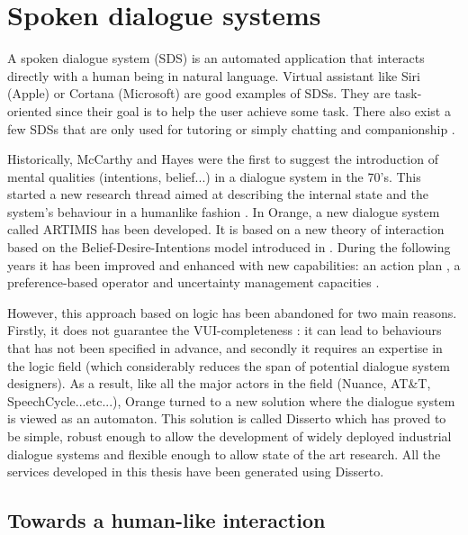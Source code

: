 \section{Spoken dialogue systems}
        
	A spoken dialogue system (SDS) is an automated application that interacts directly with a human being in natural language. Virtual assistant like Siri (Apple) or Cortana (Microsoft) are good examples of SDSs. They are task-oriented since their goal is to help the user achieve some task. There also exist a few SDSs that are only used for tutoring \cite{Daubigney2013} or simply chatting and companionship \cite{Sidner2013}.
	
	Historically, McCarthy and Hayes were the first to suggest the introduction of mental qualities (intentions, belief...) in a dialogue system \cite{McCarthy1969,McCarthy1979} in the 70's. This started a new research thread aimed at describing the internal state and the system's behaviour in a humanlike fashion \cite{Newell1980,Bratman1987,Cohen1990,Sadek1991,Konolige1993}. In Orange, a new dialogue system called ARTIMIS has been developed. It is based on a new theory of interaction \cite{Sadek1991} based on the Belief-Desire-Intentions model introduced in \cite{Bratman1988}. During the following years it has been improved and enhanced with new capabilities: an action plan \cite{Louis2002}, a preference-based operator \cite{Meyer2006} and uncertainty management capacities \cite{Laroche2008}.
	
	However, this approach based on logic has been abandoned for two main reasons. Firstly, it does not guarantee the VUI-completeness \cite{Pieraccini2005,Paek2008}: it can lead to behaviours that has not been specified in advance, and secondly it requires an expertise in the logic field (which considerably reduces the span of potential dialogue system designers). As a result, like all the major actors in the field (Nuance, AT\&T, SpeechCycle...etc...), Orange turned to a new solution where the dialogue system is viewed as an automaton. This solution is called Disserto which has proved to be simple, robust enough to allow the development of widely deployed industrial dialogue systems and flexible enough to allow state of the art research. All the services developed in this thesis have been generated using Disserto.
	
	\subsection{Towards a human-like interaction}
  \label{soa:humanlike}
	
